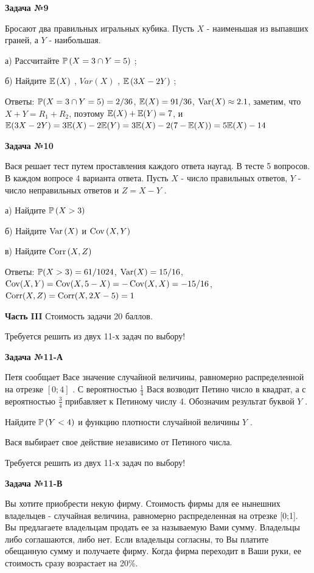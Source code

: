 \documentclass[12pt, a4paper]{article}\usepackage[]{graphicx}\usepackage[]{color}
\begin{document}
{\bf Задача №9}

Бросают два правильных игральных кубика. Пусть  $X$  - наименьшая из выпавших граней, а  $Y$  - наибольшая.

а)	Рассчитайте  $\P\left(X=3\cap Y=5\right)$ ;

б)	Найдите  $\E\left(X\right)$ ,  $Var\left(X\right)$ ,  $\E\left(3X-2Y\right)$ ;

Ответы: $\P(X=3 \cap Y=5)=2/36$, $\E(X)=91/36$, $\Var(X)\approx 2.1$, заметим, что $X+Y=R_1+R_2$, поэтому $\E(X)+\E(Y)=7$, и $\E(3X-2Y)=3\E(X)-2\E(Y)=3\E(X)-2(7-\E(X))=5\E(X)-14$

{\bf Задача №10}

Вася решает тест путем проставления каждого ответа наугад. В тесте 5 вопросов. В каждом вопросе 4 варианта ответа. Пусть  $X$  - число правильных ответов,  $Y$  - число неправильных ответов и  $Z=X-Y$ .

а)	Найдите  $\P\left(X>3\right)$

б)	Найдите  $\Var\left(X\right)$  и  $\Cov\left(X,Y\right)$

в)	Найдите  $\Corr\left(X,Z\right)$


Ответы: $\P(X>3)=61/1024$, $\Var(X)=15/16$, $\Cov(X,Y)=\Cov(X,5-X)=-\Cov(X,X)=-15/16$, $\Corr(X,Z)=\Corr(X,2X-5)=1$

{\bf Часть }{\bf III} Стоимость задачи 20 баллов.

Требуется решить {\bf {}} из двух 11-х задач по выбору!


{\bf Задача №11}{\bf -А}

Петя сообщает Васе значение случайной величины, равномерно распределенной на отрезке  $[0;4]$ . С вероятностью  $\frac{1}{4} $  Вася возводит Петино число в квадрат, а с вероятностью  $\frac{3}{4} $  прибавляет к Петиному числу 4. Обозначим результат буквой  $Y$ .

Найдите  $\P\left(Y<4\right)$  и функцию плотности случайной величины  $Y$ .

Вася выбирает свое действие независимо от Петиного числа.

Требуется решить {\bf {}} из двух 11-х задач по выбору!

{\bf Задача №11}{\bf -В}

Вы хотите приобрести некую фирму. Стоимость фирмы для ее нынешних владельцев - случайная величина, равномерно распределенная на отрезке [0;1]. Вы предлагаете владельцам продать ее за называемую Вами сумму. Владельцы либо соглашаются, либо нет. Если владельцы согласны, то Вы платите обещанную сумму и получаете фирму. Когда фирма переходит в Ваши руки, ее стоимость сразу возрастает на 20\%.
\end{document}
